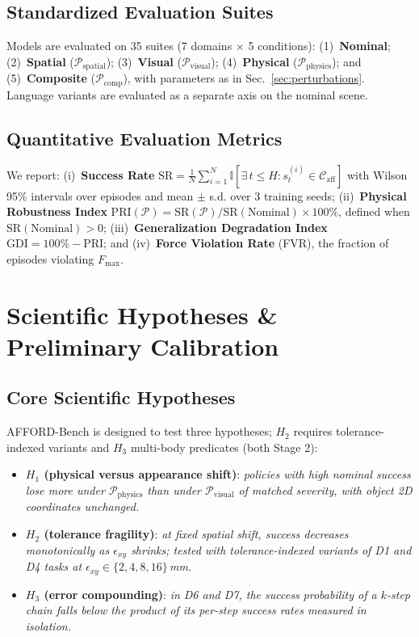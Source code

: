 \documentclass[conference]{IEEEtran}
\begin{document}
\subsection{Standardized Evaluation Suites}
Models are evaluated on 35 suites (7 domains $\times$ 5 conditions): (1)~\textbf{Nominal}; (2)~\textbf{Spatial} ($\mathcal{P}_{\mathrm{spatial}}$); (3)~\textbf{Visual} ($\mathcal{P}_{\mathrm{visual}}$); (4)~\textbf{Physical} ($\mathcal{P}_{\mathrm{physics}}$); and (5)~\textbf{Composite} ($\mathcal{P}_{\mathrm{comp}}$), with parameters as in Sec.~\ref{sec:perturbations}. Language variants are evaluated as a separate axis on the nominal scene.

\subsection{Quantitative Evaluation Metrics}
We report: (i)~\textbf{Success Rate} $\text{SR} = \frac{1}{N} \sum_{i=1}^N \mathbb{I}[\exists\, t \le H : s^{(i)}_t \in \mathcal{C}_{\text{aff}}]$ with Wilson 95\% intervals over episodes and mean $\pm$ s.d. over 3 training seeds; (ii)~\textbf{Physical Robustness Index} $\text{PRI}(\mathcal{P}) = \text{SR}(\mathcal{P}) / \text{SR}(\text{Nominal}) \times 100\%$, defined when $\text{SR}(\text{Nominal}) > 0$; (iii)~\textbf{Generalization Degradation Index} $\text{GDI} = 100\% - \text{PRI}$; and (iv)~\textbf{Force Violation Rate} (FVR), the fraction of episodes violating $F_{\max}$.

\section{Scientific Hypotheses \& Preliminary Calibration}
\label{sec:hypotheses}

\subsection{Core Scientific Hypotheses}
AFFORD-Bench is designed to test three hypotheses; $H_2$ requires tolerance-indexed variants and $H_3$ multi-body predicates (both Stage 2):
\begin{itemize}
    \item \textbf{$H_1$ (physical versus appearance shift)}: \textit{policies with high nominal success lose more under $\mathcal{P}_{\mathrm{physics}}$ than under $\mathcal{P}_{\mathrm{visual}}$ of matched severity, with object 2D coordinates unchanged.}
    \item \textbf{$H_2$ (tolerance fragility)}: \textit{at fixed spatial shift, success decreases monotonically as $\epsilon_{xy}$ shrinks; tested with tolerance-indexed variants of D1 and D4 tasks at $\epsilon_{xy} \in \{2, 4, 8, 16\}$\,mm.}
    \item \textbf{$H_3$ (error compounding)}: \textit{in D6 and D7, the success probability of a $k$-step chain falls below the product of its per-step success rates measured in isolation.}
\end{itemize}
\end{document}

